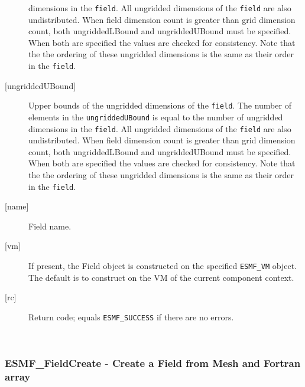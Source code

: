 \begin{description}
   dimensions in the {\tt field}. All ungridded dimensions of the
   {\tt field} are also undistributed. When field dimension count is
   greater than grid dimension count, both ungriddedLBound and ungriddedUBound
   must be specified. When both are specified the values are checked
   for consistency. Note that the the ordering of
   these ungridded dimensions is the same as their order in the {\tt field}.
   \item [{[ungriddedUBound]}]
   Upper bounds of the ungridded dimensions of the {\tt field}.
   The number of elements in the {\tt ungriddedUBound} is equal to the number of ungridded
   dimensions in the {\tt field}. All ungridded dimensions of the
   {\tt field} are also undistributed. When field dimension count is
   greater than grid dimension count, both ungriddedLBound and ungriddedUBound
   must be specified. When both are specified the values are checked
   for consistency. Note that the the ordering of
   these ungridded dimensions is the same as their order in the {\tt field}.
   \item [{[name]}]
   Field name.
   \item[{[vm]}]
   If present, the Field object is constructed on the specified
   {\tt ESMF\_VM} object. The default is to construct on the VM of the
   current component context.
   \item [{[rc]}]
   Return code; equals {\tt ESMF\_SUCCESS} if there are no errors.
   \end{description} 
 
\mbox{}\hrulefill\ 
 
\subsubsection [ESMF\_FieldCreate] {ESMF\_FieldCreate - Create a Field from Mesh and Fortran array }


